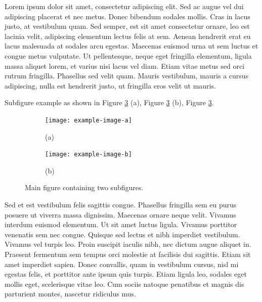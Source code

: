 Lorem ipsum dolor sit amet, consectetur adipiscing elit. Sed ac augue vel dui 
adipiscing placerat et nec metus. Donec bibendum sodales mollis. Cras in lacus 
justo, at vestibulum quam. Sed semper, est sit amet consectetur ornare, leo est 
lacinia velit, adipiscing elementum lectus felis at sem. Aenean hendrerit erat eu 
lacus malesuada at sodales arcu egestas. Maecenas euismod urna ut sem luctus et 
congue metus vulputate. Ut pellentesque, neque eget fringilla elementum, ligula 
massa aliquet lorem, et varius nisi lacus vel diam. Etiam vitae metus sed orci 
rutrum fringilla. Phasellus sed velit quam. Mauris vestibulum, mauris a cursus 
adipiscing, nulla est hendrerit justo, ut fringilla eros velit ut mauris.

Subfigure example as shown in Figure \ref{fig:ch2-2} (a), Figure \ref{fig:ch2-2} (b), Figure \ref{fig:ch2-2}.

\vspace{6pt}
\begin{figure}[ht]
    \centering
    \begin{subfigure}[b]{0.45\textwidth}
        \texttt{[image: example-image-a]}
        \captionsetup{labelformat=empty} %
        \caption*{(a)} %
        \label{fig:ch2-2a}
    \end{subfigure}
    \hfill
    \begin{subfigure}[b]{0.45\textwidth}
        \texttt{[image: example-image-b]}
        \captionsetup{labelformat=empty} %
        \caption*{(b)} %
        \label{fig:ch2-2b}
    \end{subfigure}
    \caption{Main figure containing two subfigures.}
    \label{fig:ch2-2}
\end{figure}






Sed et est vestibulum felis sagittis congue. Phasellus fringilla sem eu purus 
posuere ut viverra massa dignissim. Maecenas ornare neque velit. Vivamus interdum 
euismod elementum. Ut sit amet luctus ligula. Vivamus porttitor venenatis sem nec 
congue. Quisque sed lectus et nibh imperdiet vestibulum. Vivamus vel turpis leo. 
Proin suscipit iaculis nibh, nec dictum augue aliquet in. Praesent fermentum sem 
tempus orci molestie at facilisis dui sagittis. Etiam sit amet imperdiet sapien. 
Donec convallis, quam in vestibulum cursus, nisl mi egestas felis, et porttitor 
ante ipsum quis turpis. Etiam ligula leo, sodales eget mollis eget, scelerisque 
vitae leo. Cum sociis natoque penatibus et magnis dis parturient montes, nascetur 
ridiculus mus. 

